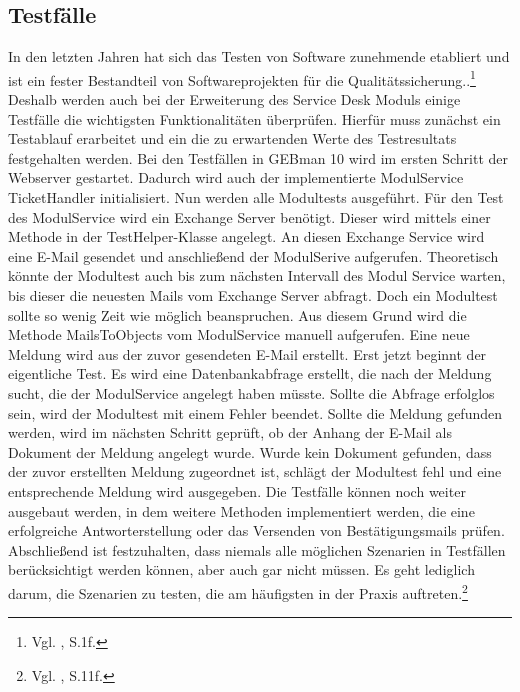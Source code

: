 \subsection{Testfälle}
\noindent
In den letzten Jahren hat sich das Testen von Software zunehmende etabliert und ist ein fester Bestandteil von Softwareprojekten für die Qualitätssicherung..\footnote{Vgl.\citeauthor{Vivenzio} \citeyear{Vivenzio}, S.1f.} Deshalb werden auch bei der Erweiterung des Service Desk Moduls einige Testfälle die wichtigsten Funktionalitäten überprüfen. Hierfür muss zunächst ein Testablauf erarbeitet und ein die zu erwartenden Werte des Testresultats festgehalten werden.\newline
Bei den Testfällen in GEBman 10 wird im ersten Schritt der Webserver gestartet. Dadurch wird auch der implementierte ModulService TicketHandler initialisiert. Nun werden alle Modultests ausgeführt. Für den Test des ModulService wird ein Exchange Server benötigt. Dieser wird mittels einer Methode in der TestHelper-Klasse angelegt. An diesen Exchange Service wird eine E-Mail gesendet und anschließend der ModulSerive aufgerufen. Theoretisch könnte der Modultest auch bis zum nächsten Intervall des Modul Service warten, bis dieser die neuesten Mails vom Exchange Server abfragt. Doch ein Modultest sollte so wenig Zeit wie möglich beanspruchen. Aus diesem Grund wird die Methode MailsToObjects vom ModulService manuell aufgerufen. Eine neue Meldung wird aus der zuvor gesendeten E-Mail erstellt. Erst jetzt beginnt der eigentliche Test. Es wird eine Datenbankabfrage erstellt, die nach der Meldung sucht, die der ModulService angelegt haben müsste. Sollte die Abfrage erfolglos sein, wird der Modultest mit einem Fehler beendet. Sollte die Meldung gefunden werden, wird im nächsten Schritt geprüft, ob der Anhang der E-Mail als Dokument der Meldung angelegt wurde. Wurde kein Dokument gefunden, dass der zuvor erstellten Meldung zugeordnet ist, schlägt der Modultest fehl und eine entsprechende Meldung wird ausgegeben.\newline
Die Testfälle können noch weiter ausgebaut werden, in dem weitere Methoden implementiert werden, die eine erfolgreiche Antworterstellung oder das Versenden von Bestätigungsmails prüfen. Abschließend ist festzuhalten, dass niemals alle möglichen Szenarien in Testfällen berücksichtigt werden können, aber auch gar nicht müssen. Es geht lediglich darum, die Szenarien zu testen, die am häufigsten in der Praxis auftreten.\footnote{Vgl.\citeauthor{Witte} \citeyear{Witte}, S.11f.}\\


